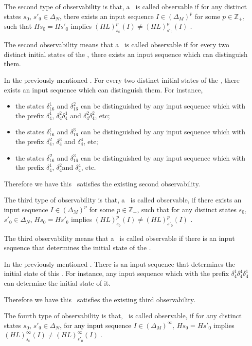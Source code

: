 \begin{definition}
	The second type of observability is that, a \BCN\ is called observable if for any distinct states $s_0$, ${s'}_0 \in \Delta_N$, there exists an input sequence $I\in(\Delta_M)^p$ for some $p\in \mathbb{Z}_+$, such that $Hs_0=H{s'}_0$ implies $(HL)^p_{s_0}(I)\neq (HL)^p_{{s'}_0}(I)$ \cite{Zhao2010Input}.
\end{definition}

The second observability means that a \BCN\ is called observable if for every two distinct initial states of the  \BCN, there exists an input sequence which can distinguish them. 
\begin{example}
In the previously mentioned \BCN. For every two distinct initial states of the \BCN, there exists an input sequence which can distinguish them.  For instance,
\begin{itemize}
  \item the states $\delta_{16}^1$ and $\delta_{16}^2$ can be distinguished by any input sequence which with the prefix $\delta_{4}^1$, $\delta_{4}^2 \delta_{4}^1$ and $\delta_{4}^2 \delta_{4}^2$, etc;
  \item the states $\delta_{16}^1$ and $\delta_{16}^3$  can be distinguished by any input sequence which with the prefix $\delta_{4}^2$, $\delta_{4}^3$ and $\delta_{4}^4$, etc;
  \item the states $\delta_{16}^2$ and $\delta_{16}^3$  can be distinguished by any input sequence which with the prefix $\delta_{4}^1$, $\delta_{4}^2$and $\delta_{4}^4$, etc.
\end{itemize} 
Therefore we have this \BCN\ satisfies the existing second observability.
\end{example}   
\begin{definition}
	The third type of observability is that, a \BCN\ is called observable, if there exists an input sequence $I\in(\Delta_M)^p$ for some $p\in \mathbb{Z}_+$, such that for any distinct states $s_0$, ${s'}_0 \in \Delta_N$, $Hs_0=H{s'}_0$ implies $(HL)^p_{s_0}(I)\neq (HL)^p_{{s'}_0}(I)$ \cite{Cheng2011Identification}.
\end{definition}

The third observability means that a \BCN\ is called observable if there is an input sequence that determines the initial state of the \BCN.

\begin{example}
In the previously mentioned \BCN. There is an input sequence that determines the initial state of this \BCN.  For instance, any input sequence which with the prefix $\delta_{4}^1\delta_{4}^4\delta_{4}^1$ can determine the initial state of it.

Therefore we have this \BCN\ satisfies the existing third observability.
\end{example}  
\begin{definition}
	The fourth type of observability is that, \BCN\ is called observable, if for any distinct states $s_0$, ${s'}_0 \in \Delta_N$, for any input sequence $I\in(\Delta_M)^{\infty}$, $Hs_0=H{s'}_0$ implies $(HL)^{\infty}_{s_0}(I)\neq (HL)^{\infty}_{{s'}_0}(I)$ \cite{Fornasini2013Observability}.
\end{definition}

